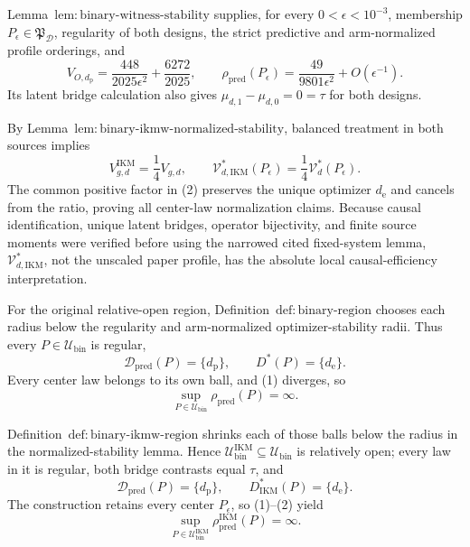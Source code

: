 Lemma~\(\mathrm{lem{:}binary\text{-}witness\text{-}stability}\) supplies, for every \(0<\epsilon<10^{-3}\), membership \(P_\epsilon\in\mathfrak P_{\mathcal D}\), regularity of both designs, the strict predictive and arm-normalized profile orderings, and
\[
 V_{O,d_{\mathrm p}}
 =\frac{448}{2025\epsilon^2}+\frac{6272}{2025},
 \qquad
 \rho_{\mathrm{pred}}(P_\epsilon)
 =\frac{49}{9801\epsilon^2}+O(\epsilon^{-1}). \tag{1}
\]
Its latent bridge calculation also gives \(\mu_{d,1}-\mu_{d,0}=0=\tau\) for both designs.

By Lemma~\(\mathrm{lem{:}binary\text{-}ikmw\text{-}normalized\text{-}stability}\), balanced treatment in both sources implies
\[
 V_{g,d}^{\mathrm{IKM}}=\frac14V_{g,d},
 \qquad
 \mathcal V_{d,\mathrm{IKM}}^*(P_\epsilon)
 =\frac14\mathcal V_d^*(P_\epsilon). \tag{2}
\]
The common positive factor in (2) preserves the unique optimizer \(d_{\mathrm e}\) and cancels from the ratio, proving all center-law normalization claims. Because causal identification, unique latent bridges, operator bijectivity, and finite source moments were verified before using the narrowed cited fixed-system lemma, \(\mathcal V_{d,\mathrm{IKM}}^*\), not the unscaled paper profile, has the absolute local causal-efficiency interpretation.

For the original relative-open region, Definition~\(\mathrm{def{:}binary\text{-}region}\) chooses each radius below the regularity and arm-normalized optimizer-stability radii. Thus every \(P\in\mathcal U_{\mathrm{bin}}\) is regular,
\[
 \mathcal D_{\mathrm{pred}}(P)=\{d_{\mathrm p}\},
 \qquad
 D^*(P)=\{d_{\mathrm e}\}.
\]
Every center law belongs to its own ball, and (1) diverges, so
\[
 \sup_{P\in\mathcal U_{\mathrm{bin}}}\rho_{\mathrm{pred}}(P)=\infty. \tag{3}
\]

Definition~\(\mathrm{def{:}binary\text{-}ikmw\text{-}region}\) shrinks each of those balls below the radius in the normalized-stability lemma. Hence \(\mathcal U_{\mathrm{bin}}^{\mathrm{IKM}}\subseteq\mathcal U_{\mathrm{bin}}\) is relatively open; every law in it is regular, both bridge contrasts equal \(\tau\), and
\[
 \mathcal D_{\mathrm{pred}}(P)=\{d_{\mathrm p}\},
 \qquad
 D_{\mathrm{IKM}}^*(P)=\{d_{\mathrm e}\}.
\]
The construction retains every center \(P_\epsilon\), so (1)--(2) yield
\[
 \sup_{P\in\mathcal U_{\mathrm{bin}}^{\mathrm{IKM}}}
 \rho_{\mathrm{pred}}^{\mathrm{IKM}}(P)=\infty. \tag{4}
\]

